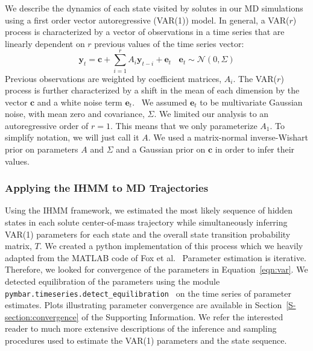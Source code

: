 \documentclass[journal=jpcbfk,manuscript=article]{achemso}
\begin{document}
  We describe the dynamics of each state visited by solutes in our MD simulations using
  a first order vector autoregressive (VAR(1)) model. In general, a VAR($r$) process is characterized by a
  vector of observations in a time series that are linearly dependent on $r$ previous
  values of the time series vector:
  \begin{equation}
  	\mathbf{y}_t = \mathbf{c} + \sum_{i=1}^r A_i\mathbf{y}_{t-i} + \mathbf{e}_t~~~~\mathbf{e}_t \sim \mathcal{N}(0, \Sigma)
  \label{eqn:var}
  \end{equation}
  Previous observations are weighted by coefficient matrices, $A_i$. The VAR($r$) 
  process is further characterized by a shift in the mean of each dimension by the
  vector $\mathbf{c}$ and a white noise term $\mathbf{e}_t$.~\cite{hamilton_time_1994}
  We assumed $\mathbf{e}_t$ to be multivariate Gaussian noise, with mean zero and
  covariance, $\Sigma$. We limited our analysis to an autoregressive order of $r=1$.
  This means that we only parameterize $A_1$. To simplify notation, we will just
  call it $A$. We used a matrix-normal inverse-Wishart prior on parameters $A$ and 
  $\Sigma$ and a Gaussian prior on $\mathbf{c}$ in order to infer their 
  values.~\cite{fox_nonparametric_2009}
   
  \subsubsection*{Applying the IHMM to MD Trajectories} 
   
  Using the IHMM framework, we estimated the most likely sequence of hidden states in
  each solute center-of-mass trajectory while simultaneously inferring VAR(1)
  parameters for each state and the overall state transition probability matrix, $T$.
  We created a python implementation of this process which we heavily adapted from
  the MATLAB code of Fox et al.~\cite{fox_bayesian_2010} Parameter estimation is iterative. 
  Therefore, we looked for convergence of the parameters in Equation~\ref{eqn:var}.
  We detected equilibration 
  of the parameters using the module \texttt{pymbar.timeseries.detect\_equilibration}~\cite{chodera_simple_2016} 
  on the time series of parameter estimates. Plots illustrating parameter convergence are 
  available in Section~\ref{S-section:convergence} of the Supporting Information. We 
  refer the interested reader to much more extensive descriptions of the inference and 
  sampling procedures used to estimate the VAR(1) parameters and the state sequence. ~\cite{beal_infinite_2002,teh_hierarchical_2006,van_gael_beam_2008,fox_nonparametric_2009,fox_bayesian_2010}
\end{document}
